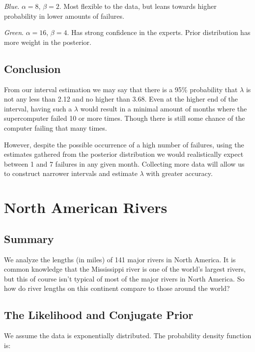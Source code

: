 \documentclass[12pt]{article}
\begin{document}
\noindent \textit{Blue}. $\alpha=8$, $\beta=2$.  Most flexible to the data, but leans towards higher probability in lower amounts of failures.

\noindent \textit{Green}. $\alpha=16$, $\beta=4$.  Has strong confidence in the experts.  Prior distribution has more weight in the posterior.


\subsection{Conclusion}

\noindent From our interval estimation we may say that there is a 95\% probability that $\lambda$ is not any less than 2.12 and no higher than 3.68.  Even at the higher end of the interval, having such a $\lambda$ would result in a minimal amount of months where the supercomputer failed 10 or more times.  Though there is still some chance of the computer failing that many times.
\bigskip

\noindent However, despite the possible occurrence of a high number of failures, using the estimates gathered from the posterior distribution we would realistically expect between 1 and 7 failures in any given month.  Collecting more data will allow us to construct narrower intervals and estimate $\lambda$ with greater accuracy.

\newpage

\section{North American Rivers}

\subsection{Summary}

\noindent We analyze the lengths (in miles) of 141 major rivers in North America.  It is common knowledge that the Mississippi river is one of the world's largest rivers, but this of course isn't typical of most of the major rivers in North America.  So how do river lengths on this continent compare to those around the world?

\subsection{The Likelihood and Conjugate Prior}

\noindent We assume the data is exponentially distributed.  The probability density function is:
\end{document}

